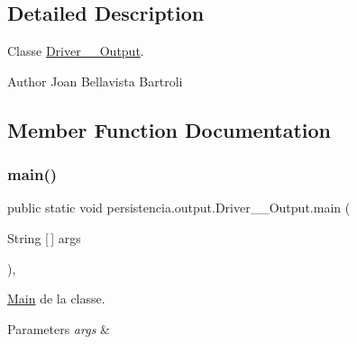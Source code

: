 \subsection{Detailed Description}
Classe \hyperlink{classpersistencia_1_1output_1_1Driver____Output}{Driver\+\_\+\+\_\+\+Output}. 

\begin{DoxyAuthor}{Author}
Joan Bellavista Bartroli 
\end{DoxyAuthor}


\subsection{Member Function Documentation}
\mbox{\label{classpersistencia_1_1output_1_1Driver____Output_a1fcfdd813a7c5460772e74b5709fc030}} 
\subsubsection{\texorpdfstring{main()}{main()}}
{\footnotesize\ttfamily public static void persistencia.\+output.\+Driver\+\_\+\+\_\+\+Output.\+main (\begin{DoxyParamCaption}\item[{String \mbox{[}$\,$\mbox{]}}]{args }\end{DoxyParamCaption})\hspace{0.3cm}{\ttfamily [inline]}, {\ttfamily [static]}}



\hyperlink{classMain}{Main} de la classe. 


\begin{DoxyParams}{Parameters}
{\em args} & \\
\hline
\end{DoxyParams}

